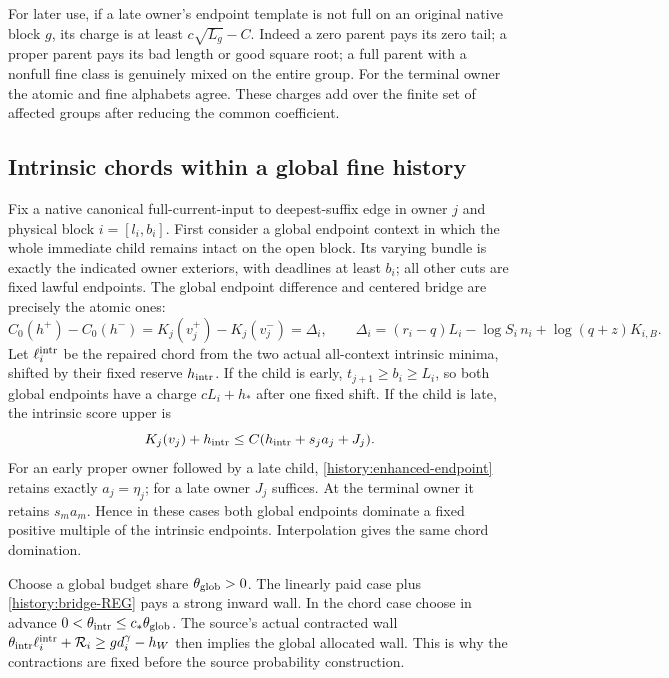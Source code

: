For later use, if a late owner's endpoint template is not full on an
original native block $g$, its charge is at least $c\sqrt{L_g}-C$.
Indeed a zero parent pays its zero tail; a proper parent pays its bad
length or good square root; a full parent with a nonfull fine class
is genuinely mixed on the entire group. For the terminal owner the
atomic and fine alphabets agree. These charges add over the finite
set of affected groups after reducing the common coefficient.

\subsection{Intrinsic chords within a global fine history}

Fix a native canonical full-current-input to deepest-suffix edge in
owner $j$ and physical block $i=[l_i,b_i]$. First consider a global
endpoint context in which the whole immediate child remains intact
on the open block. Its varying bundle is exactly the indicated owner
exteriors, with deadlines at least $b_i$; all other cuts are fixed
lawful endpoints. The global endpoint difference and centered bridge
are precisely the atomic ones:
\[
 C_0(h^+)-C_0(h^-)=K_j(v_j^+)-K_j(v_j^-)=\Delta_i,
 \qquad
 \Delta_i=(r_i-q)L_i-\log S_i\,n_i+\log(q+z)K_{i,B}.
\]
Let $\ell_i^{\rm intr}$ be the repaired chord from the two actual all-context intrinsic minima,
shifted by their fixed reserve $h_{\rm intr}$.
If the child is early, $t_{j+1}\ge b_i\ge L_i$, so both global
endpoints have a charge $cL_i+h_*$ after one fixed shift. If the
child is late, the intrinsic score upper is
\[
 K_j(v_j)+h_{\rm intr}\le C(h_{\rm intr}+s_ja_j+J_j).
\]
For an early proper owner followed by a late child,
\eqref{history:enhanced-endpoint} retains exactly $a_j=\eta_j$;
for a late owner $J_j$ suffices. At the terminal owner it retains
$s_ma_m$. Hence in these cases both global endpoints dominate a
fixed positive multiple of the intrinsic endpoints. Interpolation
gives the same chord domination.

Choose a global budget share $\theta_{\rm glob}>0$. The linearly
paid case plus \eqref{history:bridge-REG} pays a strong inward wall.
In the chord case choose in advance
$0<\theta_{\rm intr}\le c_*\theta_{\rm glob}$.
The source's actual contracted wall
$\theta_{\rm intr}\ell_i^{\rm intr}+\mathcal R_i\ge gd_i^\gamma-h_W$
then implies the global allocated wall. This is why the contractions
are fixed before the source probability construction.

